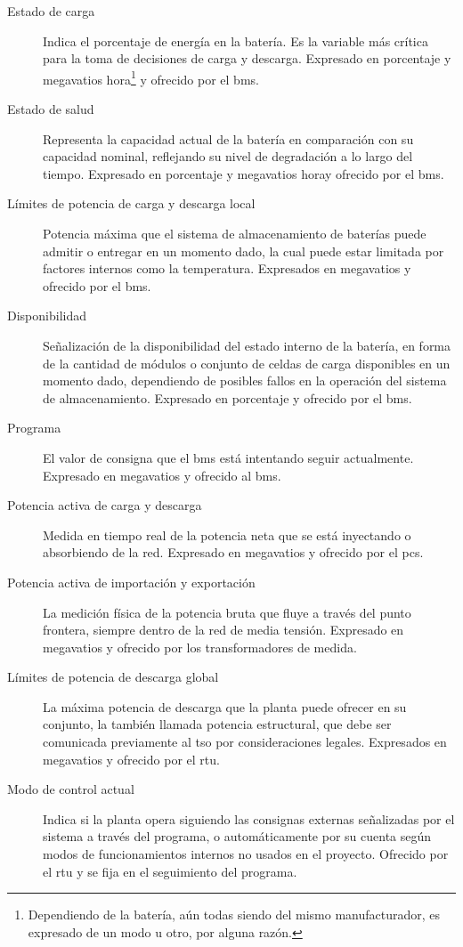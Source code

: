 \begin{description}

  \item[Estado de carga] Indica el porcentaje de energía en la batería. Es la variable más crítica para la toma de decisiones de carga y descarga. Expresado en porcentaje y megavatios hora\footnote{Dependiendo de la batería, aún todas siendo del mismo manufacturador, es expresado de un modo u otro, por alguna razón.} y ofrecido por el \gls{bms}.

  \item[Estado de salud] Representa la capacidad actual de la batería en comparación con su capacidad nominal, reflejando su nivel de degradación a lo largo del tiempo. Expresado en porcentaje y megavatios hora\footnotemark[\value{footnote}] y ofrecido por el \gls{bms}.

  \item[Límites de potencia de carga y descarga local] Potencia máxima que el sistema de almacenamiento de baterías puede admitir o entregar en un momento dado, la cual puede estar limitada por factores internos como la temperatura. Expresados en megavatios y ofrecido por el \gls{bms}.

  \item[Disponibilidad] Señalización de la disponibilidad del estado interno de la batería, en forma de la cantidad de módulos o conjunto de celdas de carga disponibles en un momento dado, dependiendo de posibles fallos en la operación del sistema de almacenamiento. Expresado en porcentaje y ofrecido por el \gls{bms}.

  \item[Programa] El valor de consigna que el \gls{bms} está intentando seguir actualmente. Expresado en megavatios y ofrecido al \gls{bms}.

  \item[Potencia activa de carga y descarga] Medida en tiempo real de la potencia neta que se está inyectando o absorbiendo de la red. Expresado en megavatios y ofrecido por el \gls{pcs}.

  \item[Potencia activa de importación y exportación] La medición física de la potencia bruta que fluye a través del punto frontera, siempre dentro de la red de media tensión. Expresado en megavatios y ofrecido por los transformadores de medida.

  \item[Límites de potencia de descarga global] La máxima potencia de descarga que la planta puede ofrecer en su conjunto, la también llamada potencia estructural, que debe ser comunicada previamente al \gls{tso} por consideraciones legales. Expresados en megavatios y ofrecido por el \gls{rtu}.

  \item[Modo de control actual] Indica si la planta opera siguiendo las consignas externas señalizadas por el sistema a través del programa, o automáticamente por su cuenta según modos de funcionamientos internos no usados en el proyecto. Ofrecido por el \gls{rtu} y se fija en el seguimiento del programa.

\end{description}

